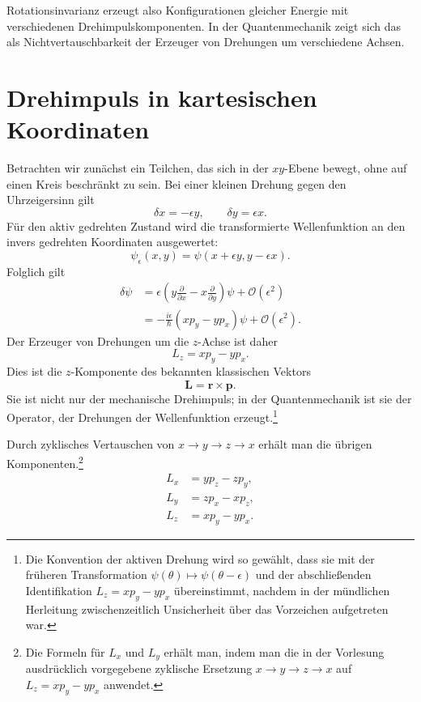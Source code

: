 Rotationsinvarianz erzeugt also Konfigurationen gleicher Energie mit verschiedenen Drehimpulskomponenten. In der Quantenmechanik zeigt sich das als Nichtvertauschbarkeit der Erzeuger von Drehungen um verschiedene Achsen.

\section{Drehimpuls in kartesischen Koordinaten}

Betrachten wir zunächst ein Teilchen, das sich in der \(xy\)-Ebene bewegt, ohne auf einen Kreis beschränkt zu sein. Bei einer kleinen Drehung gegen den Uhrzeigersinn gilt
\begin{equation}
\delta x=-\epsilon y,
\qquad
\delta y=\epsilon x.
\end{equation}
Für den aktiv gedrehten Zustand wird die transformierte Wellenfunktion an den invers gedrehten Koordinaten ausgewertet:
\begin{equation}
\psi_\epsilon(x,y)
=\psi(x+\epsilon y,y-\epsilon x).
\end{equation}
Folglich gilt
\begin{align}
\delta\psi
&=\epsilon\left(
y\frac{\partial}{\partial x}
-x\frac{\partial}{\partial y}
\right)\psi
+\mathcal O(\epsilon^2)\\
&=-\frac{i\epsilon}{\hbar}
\left(xp_y-yp_x\right)\psi
+\mathcal O(\epsilon^2).
\end{align}
Der Erzeuger von Drehungen um die \(z\)-Achse ist daher
\begin{equation}
L_z=xp_y-yp_x.
\end{equation}
Dies ist die \(z\)-Komponente des bekannten klassischen Vektors
\begin{equation}
\mathbf L=\mathbf r\times\mathbf p.
\end{equation}
Sie ist nicht nur der mechanische Drehimpuls; in der Quantenmechanik ist sie der Operator, der Drehungen der Wellenfunktion erzeugt.\footnote{Die Konvention der aktiven Drehung wird so gewählt, dass sie mit der früheren Transformation \(\psi(\theta)\mapsto\psi(\theta-\epsilon)\) und der abschließenden Identifikation \(L_z=xp_y-yp_x\) übereinstimmt, nachdem in der mündlichen Herleitung zwischenzeitlich Unsicherheit über das Vorzeichen aufgetreten war.}

Durch zyklisches Vertauschen von \(x\to y\to z\to x\) erhält man die übrigen Komponenten.\footnote{Die Formeln für \(L_x\) und \(L_y\) erhält man, indem man die in der Vorlesung ausdrücklich vorgegebene zyklische Ersetzung \(x\to y\to z\to x\) auf \(L_z=xp_y-yp_x\) anwendet.}
\begin{align}
L_x&=yp_z-zp_y,\\
L_y&=zp_x-xp_z,\\
L_z&=xp_y-yp_x.
\end{align}

